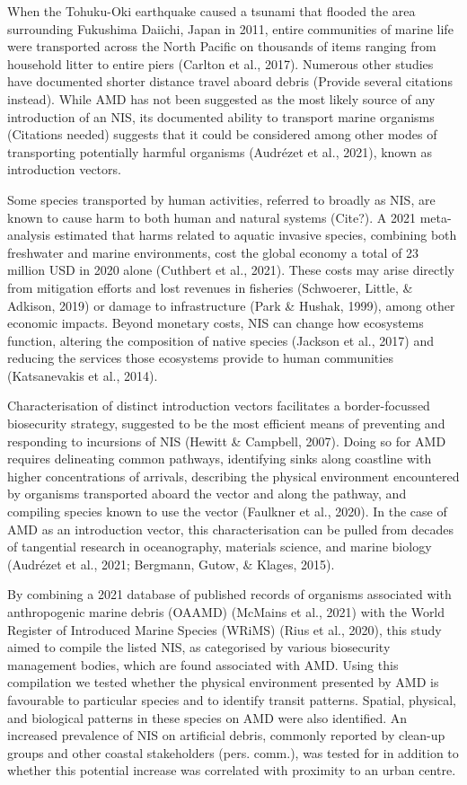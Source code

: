 \documentclass[a4paper, nobind]{templates/ociamthesis}
\begin{document}
When the Tohuku-Oki earthquake caused a tsunami that flooded the area surrounding Fukushima Daiichi, Japan in 2011, entire communities of marine life were transported across the North Pacific on thousands of items ranging from household litter to entire piers (Carlton et al., 2017). Numerous other studies have documented shorter distance travel aboard debris (Provide several citations instead). While AMD has not been suggested as the most likely source of any introduction of an NIS, its documented ability to transport marine organisms (Citations needed) suggests that it could be considered among other modes of transporting potentially harmful organisms (Audrézet et al., 2021), known as introduction vectors.

Some species transported by human activities, referred to broadly as NIS, are known to cause harm to both human and natural systems (Cite?). A 2021 meta-analysis estimated that harms related to aquatic invasive species, combining both freshwater and marine environments, cost the global economy a total of 23 million USD in 2020 alone (Cuthbert et al., 2021). These costs may arise directly from mitigation efforts and lost revenues in fisheries (Schwoerer, Little, \& Adkison, 2019) or damage to infrastructure (Park \& Hushak, 1999), among other economic impacts. Beyond monetary costs, NIS can change how ecosystems function, altering the composition of native species (Jackson et al., 2017) and reducing the services those ecosystems provide to human communities (Katsanevakis et al., 2014).

Characterisation of distinct introduction vectors facilitates a border-focussed biosecurity strategy, suggested to be the most efficient means of preventing and responding to incursions of NIS (Hewitt \& Campbell, 2007). Doing so for AMD requires delineating common pathways, identifying sinks along coastline with higher concentrations of arrivals, describing the physical environment encountered by organisms transported aboard the vector and along the pathway, and compiling species known to use the vector (Faulkner et al., 2020). In the case of AMD as an introduction vector, this characterisation can be pulled from decades of tangential research in oceanography, materials science, and marine biology (Audrézet et al., 2021; Bergmann, Gutow, \& Klages, 2015).

By combining a 2021 database of published records of organisms associated with anthropogenic marine debris (OAAMD) (McMains et al., 2021) with the World Register of Introduced Marine Species (WRiMS) (Rius et al., 2020), this study aimed to compile the listed NIS, as categorised by various biosecurity management bodies, which are found associated with AMD. Using this compilation we tested whether the physical environment presented by AMD is favourable to particular species and to identify transit patterns. Spatial, physical, and biological patterns in these species on AMD were also identified. An increased prevalence of NIS on artificial debris, commonly reported by clean-up groups and other coastal stakeholders (pers. comm.), was tested for in addition to whether this potential increase was correlated with proximity to an urban centre.
\end{document}
